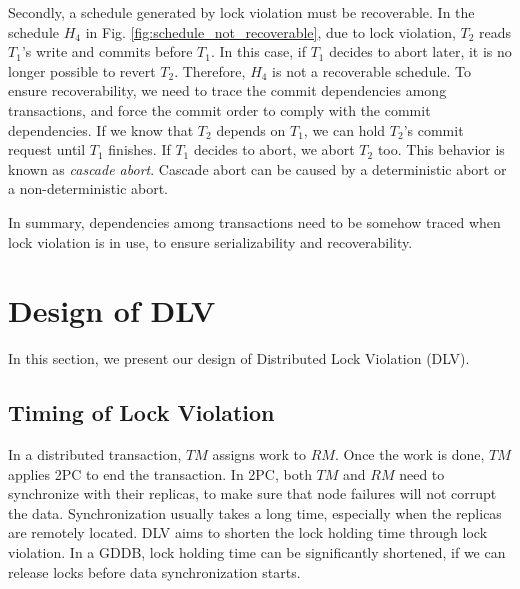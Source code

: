 \documentclass[conference]{IEEEtran}
\begin{document}
Secondly, a schedule generated by lock violation must be recoverable.
In the schedule ${H_4}$ in Fig.   \ref{fig:schedule_not_recoverable}, due to lock violation,
${T_2}$ reads  ${T_1}$'s write and commits before ${T_1}$.
In this case, if ${T_1}$ decides to abort later, it is no longer possible to revert ${T_2}$.
Therefore, ${H_4}$ is not a recoverable schedule.
To ensure recoverability, we need to trace the commit dependencies among transactions, and force the commit order to comply with the commit dependencies.
If we know that ${T_2}$ depends on ${T_1}$, we can hold ${T_2}$'s commit request until ${T_1}$ finishes.
If ${T_1}$ decides to abort, we abort ${T_2}$ too.
This behavior is known as \emph{cascade abort}.
Cascade abort can be caused by a deterministic abort or a non-deterministic abort.

In summary, dependencies among transactions need to be somehow traced when lock violation is in use, to ensure serializability and recoverability.

\section{Design of DLV}
\label{sec:implement}

In this section, we present our design of Distributed Lock Violation (DLV).

\subsection {Timing of Lock Violation}


In a distributed transaction, $TM$ assigns work to $RM$. Once the work is done, $TM$ applies 2PC to end the transaction.
In 2PC, both $TM$ and $RM$ need to synchronize with their replicas, to make sure that node failures will not corrupt the data.
Synchronization usually takes a long time, especially when the replicas are remotely located.
DLV aims to shorten the lock holding time through lock violation. 
In a GDDB, lock holding time can be significantly shortened, if we can release locks before data synchronization starts.
\end{document}
